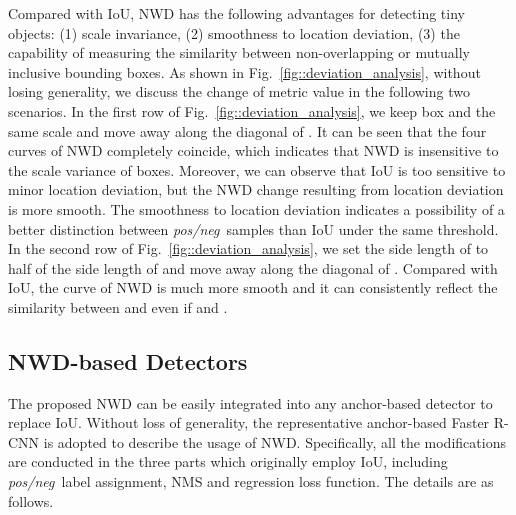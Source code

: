\documentclass{article}
\newcommand{\posneg}{\textit{pos/neg}~}
\begin{document}
Compared with IoU, NWD has the following advantages for detecting tiny objects: (1) scale invariance, (2) smoothness to location deviation, (3) the capability of measuring the similarity between non-overlapping or mutually inclusive bounding boxes. As shown in Fig.~\ref{fig::deviation_analysis}, without losing generality, we discuss the change of metric value in the following two scenarios. In the first row of Fig.~\ref{fig::deviation_analysis}, we keep box  and  the same scale and move away  along the diagonal of . It can be seen that the four curves of NWD completely coincide, which indicates that NWD is insensitive to the scale variance of boxes. Moreover, we can observe that IoU is too sensitive to minor location deviation, but the NWD change resulting from location deviation is more smooth. The smoothness to location deviation indicates a possibility of a better distinction between \posneg samples than IoU under the same threshold. In the second row of Fig.~\ref{fig::deviation_analysis}, we set the side length of  to half of the side length of  and move away  along the diagonal of . Compared with IoU, the curve of NWD is much more smooth and it can consistently reflect the similarity between  and  even if  and . 


\subsection{NWD-based Detectors}

The proposed NWD can be easily integrated into any anchor-based detector to replace IoU. Without loss of generality, the representative anchor-based Faster R-CNN is adopted to describe the usage of NWD. Specifically, all the modifications are conducted in the three parts which originally employ IoU, including \posneg label assignment, NMS and regression loss function. The details are as follows.
\end{document}
